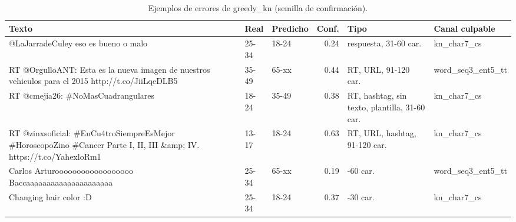 \begin{table}[htbp]
\centering
\small
\caption{Ejemplos de errores de greedy\_kn (semilla de confirmación).}
\label{tab:kn_ejemplos}
\begin{tabularx}{\linewidth}{>{\raggedright\arraybackslash}X l l r >{\raggedright\arraybackslash}p{2.4cm} l}
\hline
Texto & Real & Predicho & Conf. & Tipo & Canal culpable \\
\hline
@LaJarradeCuley eso es bueno o malo & 25-34 & 18-24 & 0.24 & respuesta, 31-60 car. & kn\_char7\_cs \\
RT @OrgulloANT: Esta es la nueva imagen de nuestros vehiculos para el 2015 http:/\allowbreak{}/\allowbreak{}t.co/\allowbreak{}JiiLqeDLB5 & 35-49 & 65-xx & 0.44 & RT, URL, 91-120 car. & word\_seq3\_ent5\_tt \\
RT @cmejia26: \#NoMasCuadrangulares & 18-24 & 35-49 & 0.38 & RT, hashtag, sin texto, plantilla, 31-60 car. & kn\_char7\_cs \\
RT @zinxsoficial: \#EnCu4troSiempreEsMejor \#HoroscopoZino \#Cancer Parte I, II, III \&amp; IV. https:/\allowbreak{}/\allowbreak{}t.co/\allowbreak{}YahexloRm1 & 13-17 & 18-24 & 0.63 & RT, URL, hashtag, 91-120 car. & kn\_char7\_cs \\
Carlos Arturoooooooooooooooooo Baccaaaaaaaaaaaaaaaaaaaaa & 25-34 & 65-xx & 0.19 & 31-60 car. & word\_seq3\_ent5\_tt \\
Changing hair color :D & 25-34 & 18-24 & 0.37 & 0-30 car. & kn\_char7\_cs \\
\hline
\end{tabularx}
\end{table}
